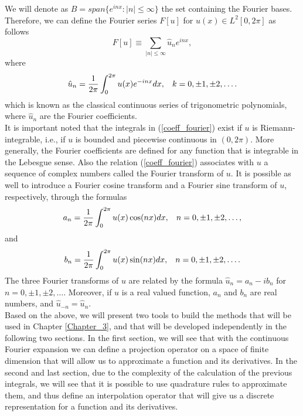 	We will denote as $B = span\{e^{inx}: |n| \leq \infty \}$ the set containing the Fourier bases. Therefore, we can define the Fourier series $F[u]$ for $u(x) \in L^2 [0, 2\pi]$ as follows 
	\begin{equation}
	\label{fourier_series}  
		F[u] \equiv \displaystyle \sum_{ |n| \leq \infty} \hat{u}_{n} e^{inx},
	\end{equation}
	where
	\begin{align}
	\label{coeff_fourier}
	\hat{u}_n = \frac{1}{2 \pi} \displaystyle \int_{0}^{2 \pi} u(x) e^{-inx} dx, \hspace{3mm}  k = 0, \pm 1, \pm 2, \dots.
	\end{align}
	which is known as the classical continuous series of trigonometric polynomials, where $\hat{u}_{n}$ are the Fourier coefficients. \\
    
    It is important noted that the integrals in (\ref{coeff_fourier}) exist if $u$ is Riemann-integrable, i.e., if $u$ is bounded and piecewise continuous in $(0, 2 \pi)$. More generally, the Fourier coefficients are defined for any function that is integrable in the Lebesgue sense. Also the relation (\ref{coeff_fourier}) associates with $u$ a sequence of complex numbers called the Fourier transform of $u$. It is possible as well to introduce a Fourier cosine transform and a Fourier sine transform of $u$, respectively, through the formulas
    \begin{align}
    \label{coeff_a_n}
    	a_n = \frac{1}{2 \pi} \displaystyle \int_{0}^{2 \pi} u(x) \cos(nx) dx, \hspace{3mm}  n = 0, \pm 1, \pm 2, \dots,
    \end{align}
    and
    \begin{align}
    \label{coeff_b_n}
    	b_n = \frac{1}{2 \pi} \displaystyle \int_{0}^{2 \pi} u(x) \sin(nx) dx, \hspace{3mm}  n = 0, \pm 1, \pm 2, \dots.
    \end{align}
    The three Fourier transforms of $u$ are related by the formula $\hat{u}_n = a_n - ib_n$ for $n = 0, \pm 1, \pm 2, \dots$. Moreover, if $u$ is a real valued function, $a_n$ and $b_n$ are real numbers, and $\hat{u}_{-n} = \hat{u}_n$. \\
	
	Based on the above, we will present two tools to build the methods that will be used in Chapter \ref{Chapter_3}, and that will be developed independently in the following two sections. In the first section, we will see that with the continuous Fourier expansion we can define a projection operator on a space of finite dimension that will allow us to approximate a function and its derivatives. In the second and last section, due to the complexity of the calculation of the previous integrals, we will see that it is possible to use quadrature rules to approximate them, and thus define an interpolation operator that will give us a discrete representation for a function and its derivatives.
	
